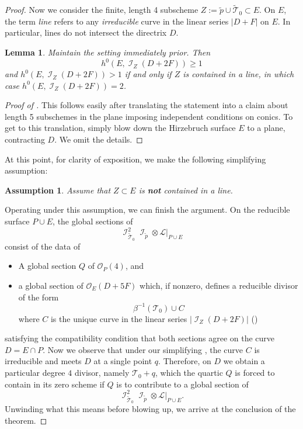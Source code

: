 \documentclass[reqno, 11pt]{amsart}
\theoremstyle{plain}
\newtheorem{lemma}[theorem]{Lemma}
\newtheorem{assumption}[theorem]{Assumption}
\theoremstyle{remark}
\DeclareMathOperator{\I}{\mathcal{I}}
\renewcommand{\O}{\mathcal{O}}
\begin{document}
\begin{proof}
Now we consider the finite, length 4 subscheme $Z := \widetilde{p} \cup \widetilde{\mathcal{T}}_{0} \subset E$.  On $E$, the term {\sl line} refers to any \emph{irreducible} curve in the linear series $|D+F|$ on $E$.  In particular, lines do not intersect the directrix $D$. 


\begin{lemma}
    \label{lemma:D2F} Maintain the setting immediately prior. Then $$h^{0}(E,\I_{Z}(D+2F)) \geq 1$$ and $h^{0}(E,\I_{Z}(D+2F)) > 1$ if and only if $Z$ is contained in a line, in which case $h^{0}(E,\I_{Z}(D+2F)) = 2$.
\end{lemma}

\begin{proof}[Proof of ]
    This follows easily after translating the statement into a claim about length 5 subschemes in the plane imposing independent conditions on conics.  To get to this translation, simply blow down the Hirzebruch surface $E$ to a plane, contracting $D$.  We omit the details.
\end{proof}

At this point, for clarity of exposition, we make the following simplifying assumption:

\begin{assumption}
\label{assumption:Noline}
    Assume that $Z \subset E$ is {\bf not} contained in a line.
\end{assumption}
Operating under this assumption, we can finish the argument. On the reducible surface $P \cup E$, the global sections of 
$$\I_{\widetilde{\mathcal{T}}_{0}}^{2}\I_{\widetilde{p}}\otimes \mathcal{L}|_{P \cup E}$$ consist of the data of
\begin{itemize}
    \item A global section $Q$ of $\O_{P}(4)$, and
    \item a global section of $\O_{E}(D+5F)$ which, if nonzero, defines a reducible divisor of the form \[\beta^{-1}(\mathcal{T}_{0}) \cup C\] where $C$ is the unique curve in the linear series $|\I_{Z}(D+2F)|$ ()
\end{itemize}
satisfying the compatibility condition that both sections agree on the curve $D = E \cap P$.  Now we observe that under our simplifying , the curve $C$ is irreducible and meets $D$ at a single point $q$.  Therefore, on $D$ we obtain a particular degree $4$ divisor, namely $\mathcal{T}_{0} + q$, which the quartic $Q$ is forced to contain in its zero scheme if $Q$ is to contribute to a global section of  $$\I_{\widetilde{\mathcal{T}}_{0}}^{2}\I_{\widetilde{p}}\otimes \mathcal{L}|_{P \cup E}.$$ Unwinding what this means before blowing up, we arrive at the conclusion of the theorem.


\end{proof}
\end{document}

